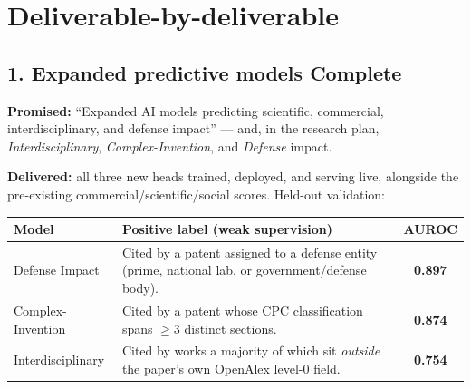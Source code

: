 \documentclass[11pt]{article}
\newcommand{\stDone}{\textbf{\textcolor{good}{Complete}}}
\begin{document}
\section{Deliverable-by-deliverable}

\subsection{1. Expanded predictive models \hfill \stDone}
\textbf{Promised:} ``Expanded AI models predicting scientific, commercial,
interdisciplinary, and defense impact'' --- and, in the research plan,
\emph{Interdisciplinary}, \emph{Complex-Invention}, and \emph{Defense} impact.

\textbf{Delivered:} all three new heads trained, deployed, and serving live,
alongside the pre-existing commercial/scientific/social scores. Held-out
validation:

\begin{center}
\begin{tabular}{@{}p{3.2cm}p{7cm}c@{}}
\toprule
\textbf{Model} & \textbf{Positive label (weak supervision)} & \textbf{AUROC} \\
\midrule
Defense Impact & Cited by a patent assigned to a defense entity (prime, national lab, or government/defense body). & \textbf{0.897} \\
Complex-Invention & Cited by a patent whose CPC classification spans $\geq 3$ distinct sections. & \textbf{0.874} \\
Interdisciplinary & Cited by works a majority of which sit \emph{outside} the paper's own OpenAlex level-0 field. & \textbf{0.754} \\
\bottomrule
\end{tabular}
\end{center}
\end{document}
